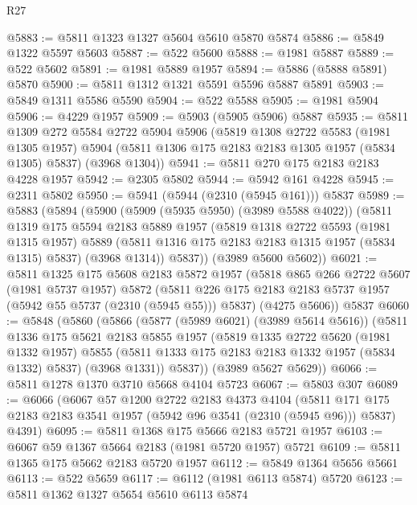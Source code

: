 \begin{lexlean}{R27}
\begin{coremodule}
@5883 := @5811 @1323 @1327 @5604 @5610 @5870 @5874
@5886 := @5849 @1322 @5597 @5603
@5887 := @522 @5600
@5888 := @1981 @5887
@5889 := @522 @5602
@5891 := @1981 @5889 @1957
@5894 := @5886 (@5888 @5891) @5870
@5900 := @5811 @1312 @1321 @5591 @5596 @5887 @5891
@5903 := @5849 @1311 @5586 @5590
@5904 := @522 @5588
@5905 := @1981 @5904
@5906 := @4229 @1957
@5909 := @5903 (@5905 @5906) @5887
@5935 := @5811
    @1309
    @272
    @5584
    @2722
    @5904
    @5906
    (@5819
      @1308
      @2722
      @5583
      (@1981 @1305 @1957)
      @5904
      (@5811 @1306 @175 @2183 @2183 @1305 @1957 (@5834 @1305) @5837)
      (@3968 @1304))
@5941 := @5811 @270 @175 @2183 @2183 @4228 @1957
@5942 := @2305 @5802
@5944 := @5942 @161 @4228
@5945 := @2311 @5802
@5950 := @5941 (@5944 (@2310 (@5945 @161))) @5837
@5989 := @5883
    (@5894
      (@5900
        (@5909 (@5935 @5950) (@3989 @5588 @4022))
        (@5811
          @1319
          @175
          @5594
          @2183
          @5889
          @1957
          (@5819
            @1318
            @2722
            @5593
            (@1981 @1315 @1957)
            @5889
            (@5811 @1316 @175 @2183 @2183 @1315 @1957 (@5834 @1315) @5837)
            (@3968 @1314))
          @5837))
      (@3989 @5600 @5602))
@6021 := @5811
    @1325
    @175
    @5608
    @2183
    @5872
    @1957
    (@5818
      @865
      @266
      @2722
      @5607
      (@1981 @5737 @1957)
      @5872
      (@5811 @226 @175 @2183 @2183 @5737 @1957 (@5942 @55 @5737 (@2310 (@5945 @55))) @5837)
      (@4275 @5606))
    @5837
@6060 := @5848
    (@5860
      (@5866
        (@5877 (@5989 @6021) (@3989 @5614 @5616))
        (@5811
          @1336
          @175
          @5621
          @2183
          @5855
          @1957
          (@5819
            @1335
            @2722
            @5620
            (@1981 @1332 @1957)
            @5855
            (@5811 @1333 @175 @2183 @2183 @1332 @1957 (@5834 @1332) @5837)
            (@3968 @1331))
          @5837))
      (@3989 @5627 @5629))
@6066 := @5811 @1278 @1370 @3710 @5668 @4104 @5723
@6067 := @5803 @307
@6089 := @6066
    (@6067
      @57
      @1200
      @2722
      @2183
      @4373
      @4104
      (@5811 @171 @175 @2183 @2183 @3541 @1957 (@5942 @96 @3541 (@2310 (@5945 @96))) @5837)
      @4391)
@6095 := @5811 @1368 @175 @5666 @2183 @5721 @1957
@6103 := @6067 @59 @1367 @5664 @2183 (@1981 @5720 @1957) @5721
@6109 := @5811 @1365 @175 @5662 @2183 @5720 @1957
@6112 := @5849 @1364 @5656 @5661
@6113 := @522 @5659
@6117 := @6112 (@1981 @6113 @5874) @5720
@6123 := @5811 @1362 @1327 @5654 @5610 @6113 @5874

\end{coremodule}
\end{lexlean}
